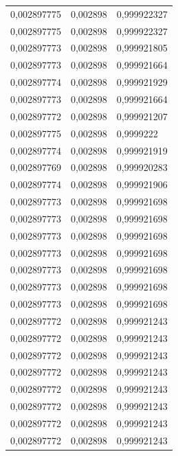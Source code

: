 \begin{center}
\begin{longtable}{|l|l|l|}
0,002897775        & 0,002898              & 0,999922327  \\
0,002897775        & 0,002898              & 0,999922327  \\
0,002897773        & 0,002898              & 0,999921805  \\
0,002897773        & 0,002898              & 0,999921664  \\
0,002897774        & 0,002898              & 0,999921929  \\
0,002897773        & 0,002898              & 0,999921664  \\
0,002897772        & 0,002898              & 0,999921207  \\
0,002897775        & 0,002898              & 0,9999222    \\
0,002897774        & 0,002898              & 0,999921919  \\
0,002897769        & 0,002898              & 0,999920283  \\
0,002897774        & 0,002898              & 0,999921906  \\
0,002897773        & 0,002898              & 0,999921698  \\
0,002897773        & 0,002898              & 0,999921698  \\
0,002897773        & 0,002898              & 0,999921698  \\
0,002897773        & 0,002898              & 0,999921698  \\
0,002897773        & 0,002898              & 0,999921698  \\
0,002897773        & 0,002898              & 0,999921698  \\
0,002897773        & 0,002898              & 0,999921698  \\
0,002897772        & 0,002898              & 0,999921243  \\
0,002897772        & 0,002898              & 0,999921243  \\
0,002897772        & 0,002898              & 0,999921243  \\
0,002897772        & 0,002898              & 0,999921243  \\
0,002897772        & 0,002898              & 0,999921243  \\
0,002897772        & 0,002898              & 0,999921243  \\
0,002897772        & 0,002898              & 0,999921243  \\
0,002897772        & 0,002898              & 0,999921243  \\

\end{longtable}
\end{center}
